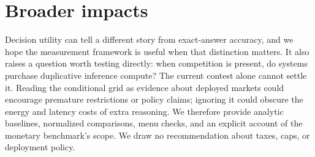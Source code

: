 \documentclass{article}
\begin{document}
\section{Broader impacts}
\label{app:broaderimpacts}
Decision utility can tell a different story from exact-answer accuracy, and we hope the measurement framework is useful when that distinction matters. It also raises a question worth testing directly: when competition is present, do systems purchase duplicative inference compute? The current contest alone cannot settle it. Reading the conditional grid as evidence about deployed markets could encourage premature restrictions or policy claims; ignoring it could obscure the energy and latency costs of extra reasoning. We therefore provide analytic baselines, normalized comparisons, menu checks, and an explicit account of the monetary benchmark's scope. We draw no recommendation about taxes, caps, or deployment policy.


\end{document}
